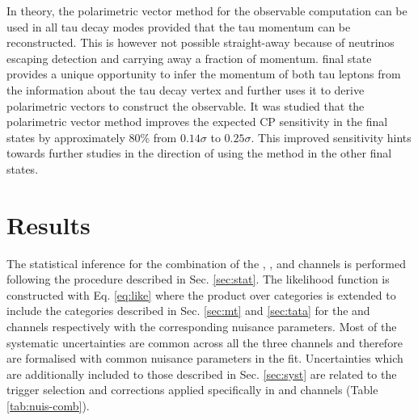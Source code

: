 In theory, the polarimetric vector method for the \phicp observable computation can be used in all tau decay modes provided that the tau momentum can be reconstructed. This is however not possible straight-away because of neutrinos escaping detection and carrying away a fraction of momentum. \aaa final state provides a unique opportunity to infer the momentum of both tau leptons from the information about the tau decay vertex and further uses it to derive polarimetric vectors to construct the \phicp observable. It was studied that the polarimetric vector method improves the expected CP sensitivity in the \aaa final states by approximately 80\% from $0.14\sigma$ to $0.25\sigma$. This improved sensitivity hints towards further studies in the direction of using the method in the other final states.

\section{Results}\label{sec:comb_res}

The statistical inference for the combination of the \et, \mt, and \tata channels is performed following the procedure described in Sec. \ref{sec:stat}. The likelihood function is constructed with Eq. \ref{eq:like} where the product over categories is extended to include the categories described in Sec. \ref{sec:mt} and \ref{sec:tata} for the \mt and \tata channels respectively with the corresponding nuisance parameters. Most of the systematic uncertainties are common across all the three channels and therefore are formalised with common nuisance parameters in the fit. Uncertainties which are additionally included to those described in Sec. \ref{sec:syst} are related to the trigger selection and corrections applied specifically in \mt and \tata channels (Table \ref{tab:nuis-comb}).

